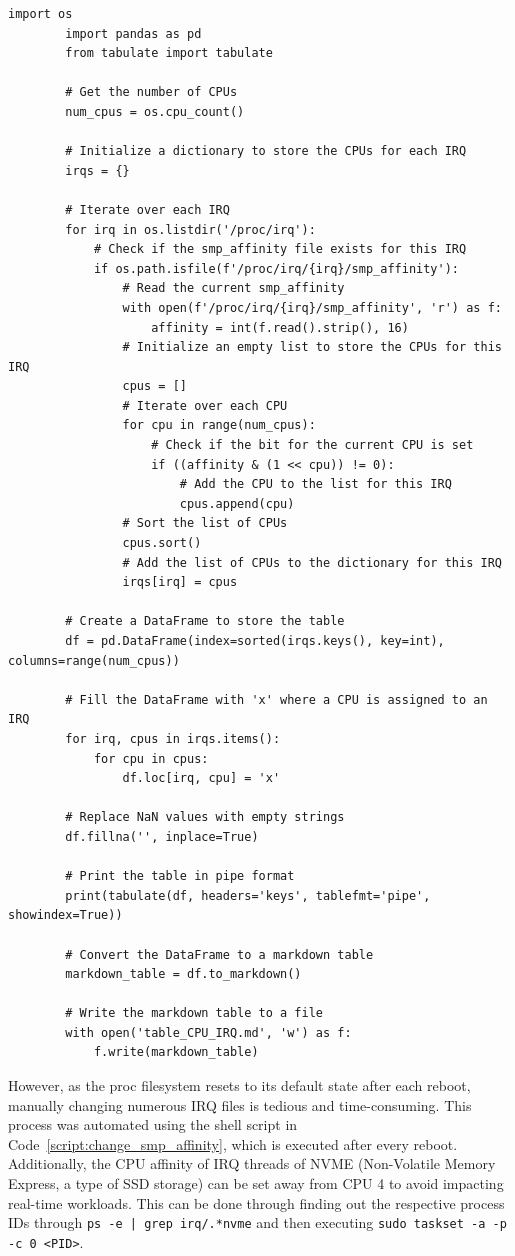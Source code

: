 \documentclass[MMR,Master,english]{twbook}
\begin{document}
\vspace{1em}
\begin{minipage}{0.95\columnwidth}
	\begin{lstlisting}[name={Check distribution of interrupt requests across each CPU},label={script:smp_affinity}]
		import os
		import pandas as pd
		from tabulate import tabulate
		
		# Get the number of CPUs
		num_cpus = os.cpu_count()
		
		# Initialize a dictionary to store the CPUs for each IRQ
		irqs = {}
		
		# Iterate over each IRQ
		for irq in os.listdir('/proc/irq'):
			# Check if the smp_affinity file exists for this IRQ
			if os.path.isfile(f'/proc/irq/{irq}/smp_affinity'):
				# Read the current smp_affinity
				with open(f'/proc/irq/{irq}/smp_affinity', 'r') as f:
					affinity = int(f.read().strip(), 16)
				# Initialize an empty list to store the CPUs for this IRQ
				cpus = []
				# Iterate over each CPU
				for cpu in range(num_cpus):
					# Check if the bit for the current CPU is set
					if ((affinity & (1 << cpu)) != 0):
						# Add the CPU to the list for this IRQ
						cpus.append(cpu)
				# Sort the list of CPUs
				cpus.sort()
				# Add the list of CPUs to the dictionary for this IRQ
				irqs[irq] = cpus
		
		# Create a DataFrame to store the table
		df = pd.DataFrame(index=sorted(irqs.keys(), key=int), columns=range(num_cpus))
		
		# Fill the DataFrame with 'x' where a CPU is assigned to an IRQ
		for irq, cpus in irqs.items():
			for cpu in cpus:
				df.loc[irq, cpu] = 'x'
		
		# Replace NaN values with empty strings
		df.fillna('', inplace=True)
		
		# Print the table in pipe format
		print(tabulate(df, headers='keys', tablefmt='pipe', showindex=True))
		
		# Convert the DataFrame to a markdown table
		markdown_table = df.to_markdown()
		
		# Write the markdown table to a file
		with open('table_CPU_IRQ.md', 'w') as f:
			f.write(markdown_table)
\end{lstlisting}
\end{minipage}


\noindent However, as the proc filesystem resets to its default state after each reboot, manually changing numerous IRQ files is tedious and time-consuming. This process was automated using the shell script in Code~\ref{script:change_smp_affinity}, which is executed after every reboot. Additionally, the CPU affinity of IRQ threads of NVME (Non-Volatile Memory Express, a type of SSD storage) can be set away from CPU 4 to avoid impacting real-time workloads. This can be done through finding out the respective process IDs through \texttt{ps -e | grep irq/.*nvme} and then executing \texttt{sudo taskset -a -p -c 0 <PID>}.
\end{document}
